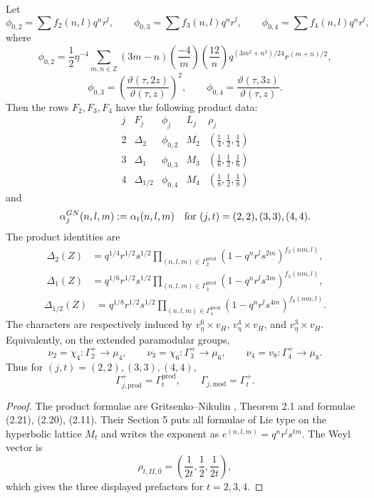 \documentclass[11pt]{memoir}
\newcommand{\Z}{\mathbb{Z}} \newcommand{\C}{\mathbb{C}}
\begin{document}
\begin{proposition}
\label{prop:gn-paramodular-row-data}
Let
$$
\phi_{0,2}=\sum f_2(n,l)q^nr^l,\qquad
\phi_{0,3}=\sum f_3(n,l)q^nr^l,\qquad
\phi_{0,4}=\sum f_4(n,l)q^nr^l,
$$
where \cite{GNII}
$$
\phi_{0,2}=\frac{1}{2}\eta^{-4}
\sum_{m,n\in\Z}(3m-n)\left({\frac{-4}{m}}\right)
\left({\frac{12}{n}}\right)q^{(3m^2+n^2)/24}r^{(m+n)/2},
$$
$$
\phi_{0,3}=\left(\frac{\vartheta(\tau,2z)}{\vartheta(\tau,z)}
\right)^2,\qquad
\phi_{0,4}=\frac{\vartheta(\tau,3z)}{\vartheta(\tau,z)}.
$$
Then the rows $F_2,F_3,F_4$ have the following product data:
$$
\begin{array}{c|c|c|c|c}
j&F_j&\phi_j&L_j&\rho_j\\ \hline
2&\Delta_2&\phi_{0,2}&M_2&(\frac14,\frac12,\frac14)\\
3&\Delta_1&\phi_{0,3}&M_3&(\frac16,\frac12,\frac16)\\
4&\Delta_{1/2}&\phi_{0,4}&M_4&(\frac18,\frac12,\frac18)
\end{array}
$$
and
$$
\alpha_j^{\mathrm{GN}}(n,l,m):=\alpha_t(n,l,m)\quad
\hbox{for }(j,t)=(2,2),(3,3),(4,4).
$$
The product identities are
$$
\begin{aligned}
\Delta_2(Z)&=q^{1/4}r^{1/2}s^{1/2}
\prod_{(n,l,m)\in\Gamma_2^{\mathrm{prod}}}
(1-q^nr^ls^{2m})^{f_2(nm,l)},
\end{aligned}
$$
$$
\begin{aligned}
\Delta_1(Z)&=q^{1/6}r^{1/2}s^{1/2}
\prod_{(n,l,m)\in\Gamma_3^{\mathrm{prod}}}
(1-q^nr^ls^{3m})^{f_3(nm,l)},
\end{aligned}
$$
$$
\begin{aligned}
\Delta_{1/2}(Z)&=q^{1/8}r^{1/2}s^{1/2}
\prod_{(n,l,m)\in\Gamma_4^{\mathrm{prod}}}
(1-q^nr^ls^{4m})^{f_4(nm,l)}.
\end{aligned}
$$
The characters are respectively induced by
$v_\eta^6\times v_H$, $v_\eta^4\times v_H$, and
$v_\eta^3\times v_H$.
Equivalently, on the extended paramodular groups,
$$
\nu_2=\chi_4:\Gamma_2^+\rightarrow\mu_4,\qquad
\nu_3=\chi_6:\Gamma_3^+\rightarrow\mu_6,\qquad
\nu_4=v_8:\Gamma_4^+\rightarrow\mu_8.
$$
Thus for \((j,t)=(2,2),(3,3),(4,4)\),
$$
\Gamma_{j,\mathrm{prod}}^+=\Gamma_t^{\mathrm{prod}},\qquad
\Gamma_{j,\mathrm{mod}}=\Gamma_t^+.
$$
\end{proposition}

\begin{proof}
The product formulae are Gritsenko--Nikulin \cite{GNII},
Theorem 2.1 and formulae (2.21), (2.20), (2.11).  Their Section 5
puts all formulae of Lie type on the hyperbolic lattice $M_t$ and writes
the exponent as $e^{(n,l,m)}=q^nr^ls^{tm}$.  The Weyl vector is
$$\rho_{t,II,\overline0}
=\left(\frac{1}{2t},\frac{1}{2},\frac{1}{2t}\right),$$
which gives the three displayed prefactors for $t=2,3,4$.
\end{proof}
\end{document}
